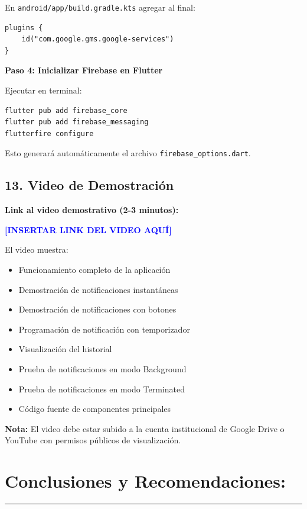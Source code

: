 \documentclass[12pt,a4paper]{article}
\newcommand{\grayline}{\noindent\textcolor{gray}{\rule{\textwidth}{1pt}}}
\begin{document}
En \texttt{android/app/build.gradle.kts} agregar al final:
\begin{verbatim}
plugins {
    id("com.google.gms.google-services")
}
\end{verbatim}

\textbf{Paso 4: Inicializar Firebase en Flutter}

Ejecutar en terminal:
\begin{verbatim}
flutter pub add firebase_core
flutter pub add firebase_messaging
flutterfire configure
\end{verbatim}

Esto generará automáticamente el archivo \texttt{firebase\_options.dart}.

\subsection*{13. Video de Demostración}

\textbf{Link al video demostrativo (2-3 minutos):}

\vspace{0.5cm}

\textcolor{blue}{\textbf{[INSERTAR LINK DEL VIDEO AQUÍ]}}

\vspace{0.5cm}

El video muestra:
\begin{itemize}
    \item Funcionamiento completo de la aplicación
    \item Demostración de notificaciones instantáneas
    \item Demostración de notificaciones con botones
    \item Programación de notificación con temporizador
    \item Visualización del historial
    \item Prueba de notificaciones en modo Background
    \item Prueba de notificaciones en modo Terminated
    \item Código fuente de componentes principales
\end{itemize}

\textbf{Nota:} El video debe estar subido a la cuenta institucional de Google Drive o YouTube con permisos públicos de visualización.

\vspace{1cm}

\section*{Conclusiones y Recomendaciones:}
\grayline{}
\vspace{0.3cm}
\end{document}
